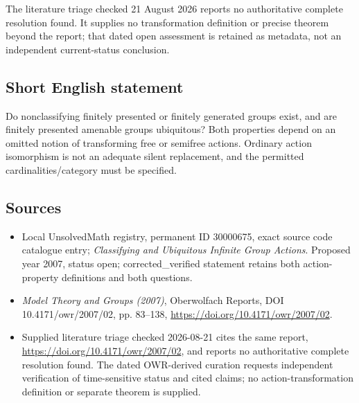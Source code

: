 \documentclass[11pt]{article}
\begin{document}
The literature triage checked 21 August 2026 reports no authoritative complete resolution found. It supplies no transformation definition or precise theorem beyond the report; that dated open assessment is retained as metadata, not an independent current-status conclusion.
\subsection{Short English statement}
Do nonclassifying finitely presented or finitely generated groups exist, and are finitely presented amenable groups ubiquitous? Both properties depend on an omitted notion of transforming free or semifree actions. Ordinary action isomorphism is not an adequate silent replacement, and the permitted cardinalities/category must be specified.
\subsection{Sources}
\begin{itemize}
\item Local UnsolvedMath registry, permanent ID 30000675, exact source code catalogue entry; \emph{Classifying and Ubiquitous Infinite Group Actions}. Proposed year 2007, status open; corrected\_verified statement retains both action-property definitions and both questions.
\item \emph{Model Theory and Groups (2007)}, Oberwolfach Reports, DOI 10.4171/owr/2007/02, pp. 83--138, \url{https://doi.org/10.4171/owr/2007/02}.
\item Supplied literature triage checked 2026-08-21 cites the same report, \url{https://doi.org/10.4171/owr/2007/02}, and reports no authoritative complete resolution found. The dated OWR-derived curation requests independent verification of time-sensitive status and cited claims; no action-transformation definition or separate theorem is supplied.
\end{itemize}
\end{document}
